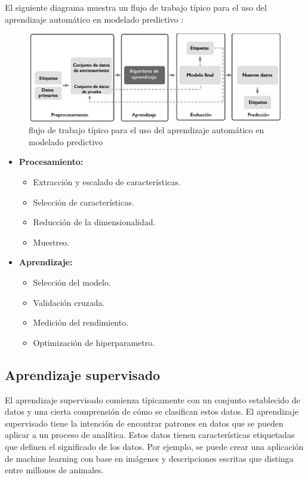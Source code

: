 \vspace{1\baselineskip}
El siguiente diagrama muestra un flujo de trabajo típico para el uso del
aprendizaje automático en modelado predictivo \cite{mirjalili2020python}:

\begin{figure}[H]
  \begin{center}
    \includegraphics[scale=0.80]{./uso_aprendisaje_automatico.png}
    \caption{ flujo de trabajo típico para el uso del aprendizaje automático en modelado predictivo}
    \label{fig:perceptron}
  \end{center}
\end{figure}
\begin{itemize}
  \item \textbf{Procesamiento:}
        \begin{itemize}
          \item Extracción y escalado de características.
          \item Selección de características.
          \item Reducción de la dimensionalidad.
          \item Muestreo.
        \end{itemize}
  \item \textbf{Aprendizaje:}
        \begin{itemize}
          \item Selección del modelo.
          \item Validación cruzada.
          \item Medición del rendimiento.
          \item Optimización de hiperparametro.
        \end{itemize}
\end{itemize}
\subsection{Aprendizaje supervisado}

El aprendizaje supervisado comienza típicamente con un conjunto establecido de
datos y una cierta comprensión de cómo se clasifican estos datos. El
aprendizaje supervisado tiene la intención de encontrar patrones en datos que
se pueden aplicar a un proceso de analítica. Estos datos tienen características
etiquetadas que definen el significado de los datos. Por ejemplo, se puede
crear una aplicación de machine learning con base en imágenes y descripciones
escritas que distinga entre millones de animales\cite{ibm}.

